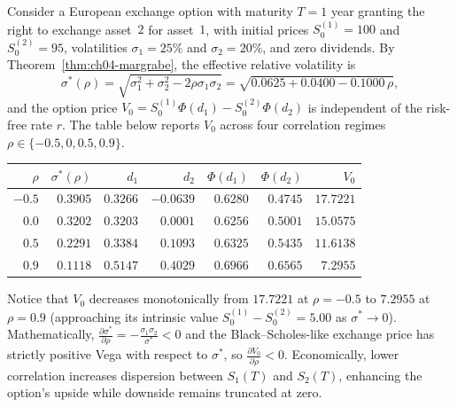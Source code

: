 \begin{example}
    \label{ex:ch04-margrabe}
    Consider a European exchange option with maturity $T = 1$ year granting the right to exchange asset~$2$ for asset~$1$, with initial prices $S_0^{(1)} = 100$ and $S_0^{(2)} = 95$, volatilities $\sigma_1 = 25\%$ and $\sigma_2 = 20\%$, and zero dividends. By Theorem~\ref{thm:ch04-margrabe}, the effective relative volatility is
    \[
        \sigma^*(\rho) = \sqrt{\sigma_1^2 + \sigma_2^2 - 2\rho\sigma_1\sigma_2}
        = \sqrt{0.0625 + 0.0400 - 0.1000\,\rho},
    \]
    and the option price $V_0 = S_0^{(1)}\Phi(d_1) - S_0^{(2)}\Phi(d_2)$ is independent of the risk-free rate $r$. The table below reports $V_0$ across four correlation regimes $\rho \in \{-0.5, 0, 0.5, 0.9\}$.

    \begin{center}
        \begin{tabular}{rrrrrrr}
            \toprule
            $\rho$ & $\sigma^*(\rho)$ & $d_1$ & $d_2$ & $\Phi(d_1)$ & $\Phi(d_2)$ & $V_0$ \\
            \midrule
            $-0.5$ & $0.3905$ & $0.3266$ & $-0.0639$ & $0.6280$ & $0.4745$ & $17.7221$ \\
            $0.0$  & $0.3202$ & $0.3203$ & $0.0001$  & $0.6256$ & $0.5001$ & $15.0575$ \\
            $0.5$  & $0.2291$ & $0.3384$ & $0.1093$  & $0.6325$ & $0.5435$ & $11.6138$ \\
            $0.9$  & $0.1118$ & $0.5147$ & $0.4029$  & $0.6966$ & $0.6565$ & $7.2955$ \\
            \bottomrule
        \end{tabular}
    \end{center}
    Notice that $V_0$ decreases monotonically from $17.7221$ at $\rho = -0.5$ to $7.2955$ at $\rho = 0.9$ (approaching its intrinsic value $S_0^{(1)} - S_0^{(2)} = 5.00$ as $\sigma^* \to 0$). Mathematically, $\frac{\partial \sigma^*}{\partial \rho} = -\frac{\sigma_1\sigma_2}{\sigma^*} < 0$ and the Black--Scholes-like exchange price has strictly positive Vega with respect to $\sigma^*$, so $\frac{\partial V_0}{\partial \rho} < 0$. Economically, lower correlation increases dispersion between $S_1(T)$ and $S_2(T)$, enhancing the option's upside while downside remains truncated at zero.
\end{example}
